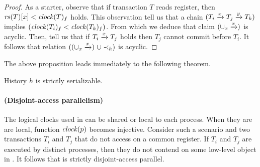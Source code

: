 \begin{proof}
  As a starter, observe that if transaction $T$ reads register, then $\readSetOf{T}[x] < \clockOf{T}_f$ holds.
  This observation tell us that a chain $(T_i \stmPrec{x} T_j \stmPrec{y} T_k)$ implies $(\clockOf{T_i}_f < \clockOf{T_k}_f)$.
  From which we deduce that claim $(\union_{x} \stmPrec{x})$ is acyclic.
  Then,  tell us that if $T_i \stmPrec{x} T_j$ holds then $T_j$ cannot commit before $T_i$.
  It follows that relation $((\union_{x} \stmPrec{x}) ~\union \hb_h)$ is acyclic.  
\end{proof}

The above proposition leads immediately to the following theorem.

\begin{theorem}
  History $h$ is strictly serializable.
\end{theorem}

\paragraph{(Disjoint-access parallelism)}
The logical clocks used in  can be shared or local to each process.
When they are are local, function $\clockOf{p}$ becomes injective.
Consider such a scenario and two transactions $T_i$ and $T_j$ that do not access on a common register.
If $T_i$ and $T_j$ are executed by distinct processes, then they do not contend on some low-level object in .
It follows that  is strictly disjoint-access parallel.

